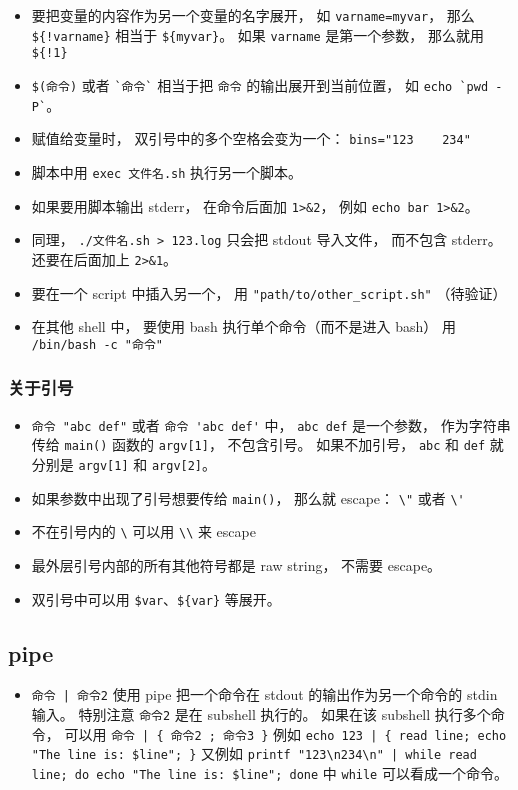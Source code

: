 \begin{itemize}
\item 要把变量的内容作为另一个变量的名字展开， 如 \verb|varname=myvar|， 那么 \verb|${!varname}| 相当于 \verb|${myvar}|。 如果 \verb|varname| 是第一个参数， 那么就用 \verb|${!1}|
\item \verb|$(命令)| 或者 \verb|`命令`| 相当于把 \verb|命令| 的输出展开到当前位置， 如 \verb|echo `pwd -P`|。
\item 赋值给变量时， 双引号中的多个空格会变为一个： \verb|bins="123    234"|
\item 脚本中用 \verb|exec 文件名.sh| 执行另一个脚本。
\item 如果要用脚本输出 stderr， 在命令后面加 \verb|1>&2|， 例如 \verb|echo bar 1>&2|。
\item 同理， \verb|./文件名.sh > 123.log| 只会把 stdout 导入文件， 而不包含 stderr。 还要在后面加上 \verb|2>&1|。
\item 要在一个 script 中插入另一个， 用 \verb|"path/to/other_script.sh"| （待验证）
\item 在其他 shell 中， 要使用 bash 执行单个命令（而不是进入 bash） 用 \verb|/bin/bash -c "命令"|
\end{itemize}

\subsubsection{关于引号}
\begin{itemize}
\item \verb|命令 "abc def"| 或者 \verb|命令 'abc def'| 中， \verb|abc def| 是一个参数， 作为字符串传给 \verb|main()| 函数的 \verb|argv[1]|， 不包含引号。 如果不加引号， \verb|abc| 和 \verb|def| 就分别是 \verb|argv[1]| 和 \verb|argv[2]|。
\item 如果参数中出现了引号想要传给 \verb|main()|， 那么就 escape： \verb|\"| 或者 \verb|\'|
\item 不在引号内的 \verb|\| 可以用 \verb|\\| 来 escape
\item 最外层引号内部的所有其他符号都是 raw string， 不需要 escape。
\item 双引号中可以用 \verb|$var|、\verb|${var}| 等展开。
\end{itemize}

\subsection{pipe}
\begin{itemize}
\item \verb`命令 | 命令2` 使用 pipe 把一个命令在 stdout 的输出作为另一个命令的 stdin 输入。 特别注意 \verb|命令2| 是在 subshell 执行的。 如果在该 subshell 执行多个命令， 可以用 \verb`命令 | { 命令2 ; 命令3 }` 例如 \verb`echo 123 | { read line; echo "The line is: $line"; }` 又例如 \verb`printf "123\n234\n" | while read line; do echo "The line is: $line"; done` 中 \verb|while| 可以看成一个命令。
\end{itemize}


